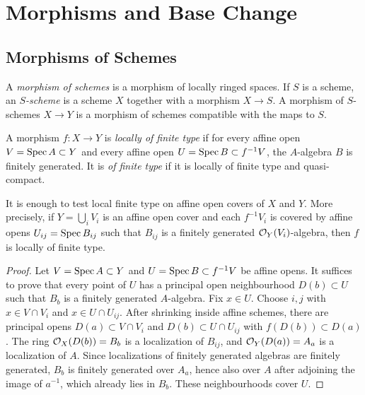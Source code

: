 \chapter{Morphisms and Base Change}

\section{Morphisms of Schemes}

\begin{definition}
A \emph{morphism of schemes} is a morphism of locally ringed spaces.  If \(S\)
is a scheme, an \emph{\(S\)-scheme} is a scheme \(X\) together with a morphism
\(X\to S\).  A morphism of \(S\)-schemes \(X\to Y\) is a morphism of schemes
compatible with the maps to \(S\).
\end{definition}

\begin{definition}
A morphism \(f:X\to Y\) is \emph{locally of finite type} if for every affine
open \(V=\operatorname{Spec} A\subset Y\) and every affine open \(U=\operatorname{Spec} B\subset f^{-1}V\),
the \(A\)-algebra \(B\) is finitely generated.  It is \emph{of finite type} if
it is locally of finite type and quasi-compact.
\end{definition}

\begin{proposition}
It is enough to test local finite type on affine open covers of \(X\) and
\(Y\).  More precisely, if \(Y=\bigcup_i V_i\) is an affine open cover and each
\(f^{-1}V_i\) is covered by affine opens \(U_{ij}=\operatorname{Spec} B_{ij}\) such that
\(B_{ij}\) is a finitely generated \(\mathcal{O}_Y(V_i)\)-algebra, then \(f\) is locally
of finite type.
\end{proposition}

\begin{proof}
Let \(V=\operatorname{Spec} A\subset Y\) and \(U=\operatorname{Spec} B\subset f^{-1}V\) be affine opens.  It
suffices to prove that every point of \(U\) has a principal open neighbourhood
\(D(b)\subset U\) such that \(B_b\) is a finitely generated \(A\)-algebra.  Fix
\(x\in U\).  Choose \(i,j\) with \(x\in V\cap V_i\) and
\(x\in U\cap U_{ij}\).  After shrinking inside affine schemes, there are
principal opens \(D(a)\subset V\cap V_i\) and
\(D(b)\subset U\cap U_{ij}\) with \(f(D(b))\subset D(a)\).  The ring
\(\mathcal{O}_X(D(b))=B_b\) is a localization of \(B_{ij}\), and
\(\mathcal{O}_Y(D(a))=A_a\) is a localization of \(A\).  Since localizations of
finitely generated algebras are finitely generated, \(B_b\) is finitely
generated over \(A_a\), hence also over \(A\) after adjoining the image of
\(a^{-1}\), which already lies in \(B_b\).  These neighbourhoods cover \(U\).
\end{proof}

